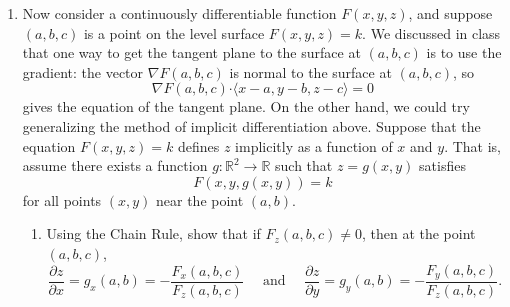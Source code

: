 \documentclass[letterpaper,12pt]{article}
\newcommand{\R}{\mathbb{R}}
\newcommand{\dotp}{\boldsymbol{\cdot}}
\newcommand{\pd}[2]{\dfrac{\partial #1}{\partial #2}}
\begin{document}
\begin{enumerate}
\begin{enumerate}
The Implicit Function Theorem for a function $f:\R^2\to\R$ states the following:
\begin{quotation}
 Let $f:D\subseteq \R^2\to \R$ be a continuously differentiable function. At any point $(a,b)$ such that $f_y(a,b)\neq 0$, the equation $f(x,y)=c$ defines $y$ implicitly as a function $g$ of $x$ for all $x$ in some interval\footnote{Don't worry too much about the ``in some interval'' part. The argument is as follows: since $f_y(x,y)$ is continuous, if $f_y(a,b)\neq 0$, then $f_y(x,y)\neq 0$ for all $(x,y)$ in some disk centred at $(a,b)$. (The function can't suddenly jump to zero.)} centred at $x=a$, and
\begin{equation}\label{eq}
 \frac{dy}{dx} = g'(x) = - \frac{f_x(x,y)}{f_y(x,y)}
\end{equation}
for all $x$ in this interval.
\end{quotation}
{\bf Assuming} that you can prove that the equation $f(x,y)=c$ defines $y$ as a function of $x$ for $x$ near $a$, if $f_y(a,b)\neq 0$, show that Equation \eqref{eq} is true.

\bigskip

Suppose that $f(x,y)=c$ implicitly defines $y=g(x)$ such that $f(x,g(x))=c$. Letting $r(x) = (x,g(x))$ and applying the Chain Rule to $f(r(x))=c$, we have
\[
 0 =\frac{d}{dx}(f(r(x))) = \pd{f}{x}\frac{dx}{dx}+\pd{f}{y}\frac{dy}{dx} = f_x(x,y)(1)+f_y(x,y)g'(x).
\]
Solving for $g'(x)$, we obtain equation \eqref{eq}. Thus, we see that in general, the first method will give us the tangent line 
\[
 y-b = -\dfrac{f_x(a,b)}{f_y(a,b)}(x-a),
\]
which is just a rearrangement of equation \eqref{qe}.
\end{enumerate}

\item Now consider a continuously differentiable function $F(x,y,z)$, and suppose $(a,b,c)$ is a point on the level surface $F(x,y,z)=k$. We discussed in class that one way to get the tangent plane to the surface at $(a,b,c)$ is to use the gradient: the vector $\nabla F(a,b,c)$ is normal to the surface at $(a,b,c)$, so
\[
 \nabla F(a,b,c) \dotp \langle x-a, y-b, z-c\rangle = 0
\]
gives the equation of the tangent plane. On the other hand, we could try generalizing the method of implicit differentiation above. Suppose that the equation $F(x,y,z)=k$ defines $z$ implicitly as a function of $x$ and $y$. That is, assume there exists a function $g:\R^2\to \R$ such that $z=g(x,y)$ satisfies
\[
 F(x,y,g(x,y))=k
\]
for all points $(x,y)$ near the point $(a,b)$.
\begin{enumerate}
 \item Using the Chain Rule, show that if $F_z(a,b,c)\neq 0$, then at the point $(a,b,c)$,
\[
 \frac{\partial z}{\partial x} = g_x(a,b) = -\frac{F_x(a,b,c)}{F_z(a,b,c)} \quad \text{ and } \quad \frac{\partial z}{\partial y} = g_y(a,b) = -\frac{F_y(a,b,c)}{F_z(a,b,c)}.
\]


\end{enumerate}
\end{enumerate}
\end{document}
